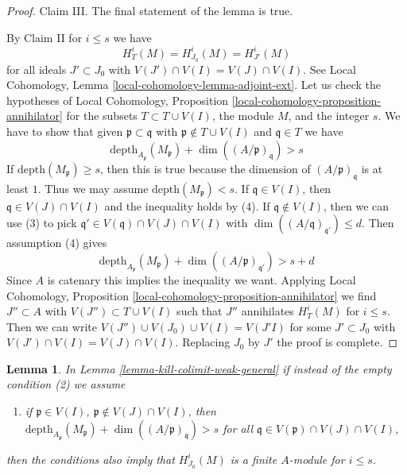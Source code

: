 \documentclass{stacks-project}
\theoremstyle{plain}
\newtheorem{lemma}[subsection]{Lemma}
\theoremstyle{definition}
\theoremstyle{remark}
\numberwithin{equation}{subsection}
\begin{document}
\begin{proof}
\medskip\noindent
Claim III. The final statement of the lemma is true.

\medskip\noindent
By Claim II for $i \leq s$ we have
$$
H^i_T(M) = H^i_{J_0}(M) = H^i_{J'}(M)
$$
for all ideals $J' \subset J_0$ with $V(J')  \cap V(I) = V(J) \cap V(I)$.
See Local Cohomology, Lemma \ref{local-cohomology-lemma-adjoint-ext}.
Let us check the hypotheses of Local Cohomology,
Proposition \ref{local-cohomology-proposition-annihilator}
for the subsets $T \subset T \cup V(I)$, the module $M$, and the integer $s$.
We have to show that given $\mathfrak p \subset \mathfrak q$
with $\mathfrak p \not \in T \cup V(I)$ and $\mathfrak q \in T$
we have
$$
\text{depth}_{A_\mathfrak p}(M_\mathfrak p) +
\dim((A/\mathfrak p)_\mathfrak q) > s
$$
If $\text{depth}(M_\mathfrak p) \geq s$, then this is true because
the dimension of $(A/\mathfrak p)_\mathfrak q$ is at least $1$.
Thus we may assume $\text{depth}(M_\mathfrak p) < s$.
If $\mathfrak q \in V(I)$, then $\mathfrak q \in V(J) \cap V(I)$
and the inequality holds by (4). If $\mathfrak q \not \in V(I)$,
then we can use (3) to pick
$\mathfrak q' \in V(\mathfrak q) \cap V(J) \cap V(I)$ with
$\dim((A/\mathfrak q)_{\mathfrak q'}) \leq d$.
Then assumption (4) gives
$$
\text{depth}_{A_\mathfrak p}(M_\mathfrak p) +
\dim((A/\mathfrak p)_{\mathfrak q'}) > s + d
$$
Since $A$ is catenary this implies the inequality we want.
Applying Local Cohomology,
Proposition \ref{local-cohomology-proposition-annihilator} we
find $J'' \subset A$ with $V(J'') \subset T \cup V(I)$
such that $J''$ annihilates $H^i_T(M)$ for $i \leq s$.
Then we can write $V(J'') \cup V(J_0) \cup V(I) = V(J'I)$
for some $J' \subset J_0$ with $V(J') \cap V(I) = V(J) \cap V(I)$.
Replacing $J_0$ by $J'$ the proof is complete.
\end{proof}

\begin{lemma}
\label{lemma-kill-colimit-general}
In Lemma \ref{lemma-kill-colimit-weak-general} if instead of the empty
condition (2) we assume
\begin{enumerate}
\item[(2')] if $\mathfrak p \in V(I)$, $\mathfrak p \not \in V(J) \cap V(I)$,
then
$\text{depth}_{A_\mathfrak p}(M_\mathfrak p) +
\dim((A/\mathfrak p)_\mathfrak q) > s$
for all $\mathfrak q \in V(\mathfrak p) \cap V(J) \cap V(I)$,
\end{enumerate}
then the conditions also imply that $H^i_{J_0}(M)$ is a finite
$A$-module for $i \leq s$.
\end{lemma}
\end{document}
